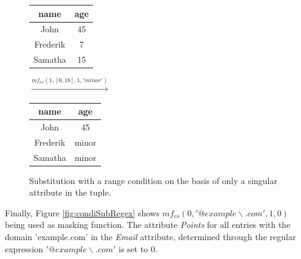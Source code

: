 \bigskip

\begin{figure}[ht]
    \begin{center}
    \footnotesize{
        \renewcommand{\arraystretch}{1.5}
        \begin{tabular}{|c|c|}
            \hline
            name & age \\
            \hline
            John & 45 \\
            \hline
            Frederik & 7 \\
            \hline
            Samatha & 15 \\
            \hline
        \end{tabular}
        \quad $\xrightarrow{mf_{cs}(1,[0, 18], 1, 'minor')}$ \quad
        \begin{tabular}{|c|c|}
            \hline
            name & age \\
            \hline
            John & 45 \\
            \hline
            Frederik & minor  \\
            \hline
            Samatha & minor \\
            \hline
        \end{tabular}
    }
    \end{center}
    \caption{Substitution with a range condition on the basis of only a singular attribute in the tuple. \label{fig:condiSubRange}}
\end{figure}

Finally, Figure \ref{fig:condiSubRegex} shows $mf_{cs}(0,'@example\backslash.com', 1, 0)$ being used as masking function. The attribute \textit{Points} for all entries with the domain 'example.com' in the \textit{Email} attribute, determined through the regular expression \textit{$'@example\backslash.com'$} is set to 0. 

\bigskip

